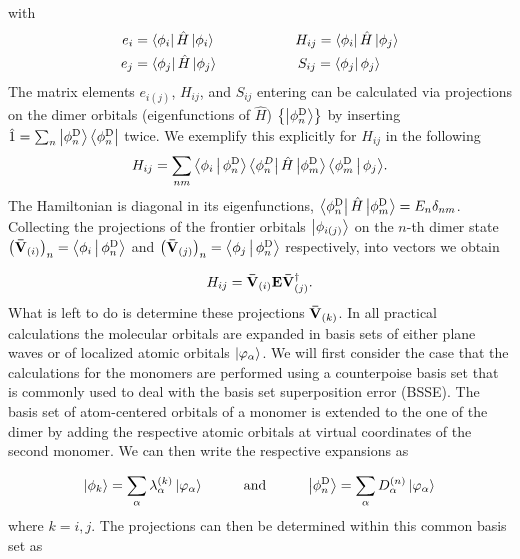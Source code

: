 %
with 
%
\begin{equation}
 \begin{aligned}
  e_i &= \Bra{\phi_i}\oper{H} \Ket{\phi_i} \hspace{2cm}  H_{ij} = \Bra{\phi_i}\oper{H} \Ket{\phi_j}\\
  e_j &= \Bra{\phi_j}\oper{H} \Ket{\phi_j} \hspace{2cm}  S_{ij} = \Bra{\phi_j} \phi_j\rangle %
 \end{aligned}
  \label{equ:dipro_eq4}
\end{equation}
The matrix elements $e_{i(j)}$, $H_{ij}$, and $S_{ij}$ entering  can be calculated via projections on the dimer orbitals (eigenfunctions of $\hat{H}$) $\left\{\Ket{\phi^\text{D}_n}\right\}$ by inserting $\hat{ 1 } = \sum_n \Ket{\phi^\text{D}_n}\Bra{\phi^\text{D}_n}$ twice. We exemplify this explicitly for $H_{ij}$ in the following
%
\begin{equation}
  H_{ij} = \sum_{nm}{\Braket{\phi_i|\phi^\text{D}_n} \Bra{\phi^{D}_n}\hat{H}\Ket{\phi^\text{D}_m}\Braket{\phi^\text{D}_m|\phi_j}} .
  \label{eq:dipro_eq16}
\end{equation}
%
The Hamiltonian is diagonal in its eigenfunctions, $\Bra{\phi^\text{D}_n}\hat{ H }\Ket{\phi^\text{D}_m} = E_n \delta_{nm}$. Collecting the projections of the frontier orbitals  $\Ket{\phi_{i(j)}}$ on the $n$-th dimer state $\left(\mathbf{ \bar{V} }_{(i)}\right)_n= \Braket{\phi_i|\phi^\text{D}_n}$ and $\left(\mathbf{ \bar{V} }_{(j)}\right)_n=\Braket{\phi_j|\phi^\text{D}_n}$ respectively, into vectors we obtain

\begin{equation}
   H_{ij} = \mathbf{ \bar{V} }_{(i)} \mathbf{ E }   \mathbf{ \bar{V} }_{(j)}^\dagger .
  \label{eq:dipro_eq17}
\end{equation}
%
What is left to do is determine these projections $\mathbf{ \bar{V} }_{(k)}$. In all practical calculations the molecular orbitals are expanded in basis sets of either plane waves or of localized atomic orbitals $\Ket{\varphi_\alpha}$. We will first consider the case that the calculations for
the monomers are performed using a counterpoise basis set that is commonly used to deal with the basis set superposition error (BSSE). The basis set of atom-centered orbitals of a monomer is extended to the one of the dimer by adding the respective atomic orbitals at virtual coordinates of the second monomer. We can then write the respective expansions as

\begin{equation}
  \Ket{\phi_{k}} = \sum_{\alpha} \lambda^{(k)}_\alpha \Ket{\varphi_\alpha} \hspace{1cm}\text{and}\hspace{1cm}
  \Ket{\phi^\text{D}_n} = \sum_{\alpha} D^{(n)}_\alpha \Ket{\varphi_\alpha}
  \label{eq:dipro_eq18}
\end{equation}
%
where $k=i,j$. The projections can then be determined within this common basis set as

